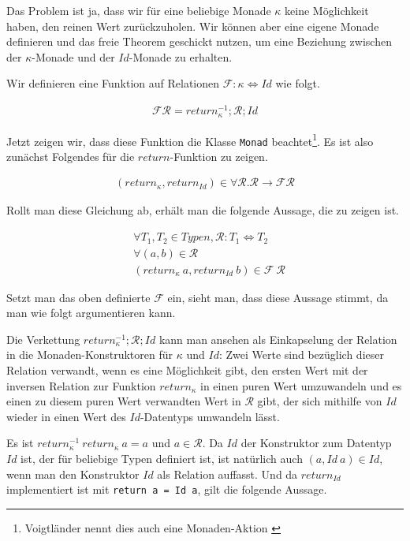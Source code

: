 Das Problem ist ja, dass wir für eine beliebige Monade $\kappa$ keine Möglichkeit haben, den reinen Wert zurückzuholen. Wir können
aber eine eigene Monade definieren und das freie Theorem geschickt nutzen, um eine Beziehung zwischen der $\kappa$-Monade
und der $Id$-Monade zu erhalten.

Wir definieren eine Funktion auf Relationen $\mathcal{F} : \kappa \Leftrightarrow Id$ wie folgt.

\begin{align*}
\mathcal{F} \mathcal{R} = return_{\kappa}^{-1} ; \mathcal{R} ; Id
\end{align*}

Jetzt zeigen wir, dass diese Funktion die Klasse \texttt{Monad} beachtet\footnote{Voigtländer nennt dies auch eine Monaden-Aktion \cite{voigtlander}}. Es ist also zunächst Folgendes für die $return$-Funktion zu zeigen.

\begin{align*}
(return_{\kappa}, return_{Id}) \in \forall \mathcal{R}. \mathcal{R} \rightarrow \mathcal{F} \mathcal{R}
\end{align*}

Rollt man diese Gleichung ab, erhält man die folgende Aussage, die zu zeigen ist.

\begin{align*}
& \forall T_1, T_2 \in Typen, \mathcal{R} : T_1 \Leftrightarrow T_2 \\
& \forall (a, b) \in \mathcal{R} \\
& (return_{\kappa}\ a, return_{Id}\ b) \in \mathcal{F}\ \mathcal{R}
\end{align*}

Setzt man das oben definierte $\mathcal{F}$ ein, sieht man, dass diese Aussage stimmt, da man wie folgt argumentieren kann.

Die Verkettung $return_{\kappa}^{-1} ; \mathcal{R} ; Id$ kann man ansehen als Einkapselung der Relation in die 
Monaden-Konstruktoren für $\kappa$ und $Id$: Zwei Werte sind bezüglich dieser Relation verwandt, wenn es
eine Möglichkeit gibt, den ersten Wert mit der inversen Relation zur Funktion $return_{\kappa}$ in einen puren Wert
umzuwandeln und es einen zu diesem puren Wert verwandten Wert in $\mathcal{R}$ gibt, der sich mithilfe von $Id$ wieder
in einen Wert des $Id$-Datentyps umwandeln lässt.

Es ist $return_{\kappa}^{-1}\ return_{\kappa}\ a = a$ und $a \in \mathcal{R}$. Da $Id$ der Konstruktor zum Datentyp $Id$
ist, der für beliebige Typen definiert ist, ist natürlich auch $(a, Id\ a) \in Id$, wenn man den Konstruktor $Id$ als Relation auffasst.
Und da $return_{Id}$ implementiert ist mit \texttt{return a = Id a}, gilt die folgende Aussage.

